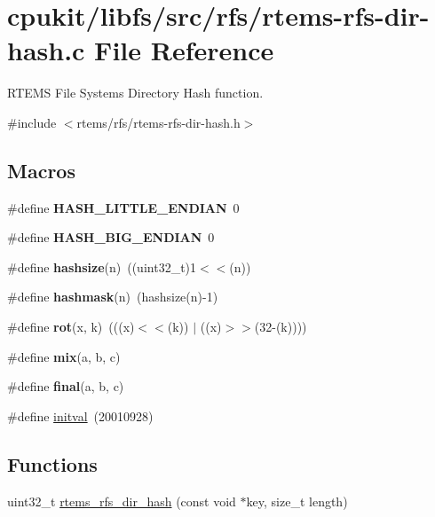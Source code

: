 \hypertarget{rtems-rfs-dir-hash_8c}{}\section{cpukit/libfs/src/rfs/rtems-\/rfs-\/dir-\/hash.c File Reference}
\label{rtems-rfs-dir-hash_8c}


R\+T\+E\+MS File Systems Directory Hash function.  


{\ttfamily \#include $<$rtems/rfs/rtems-\/rfs-\/dir-\/hash.\+h$>$}\newline
\subsection*{Macros}
\begin{DoxyCompactItemize}
\item 
\mbox{\label{rtems-rfs-dir-hash_8c_a8c49a94782a573ded31a7bb1949cbf47}} 
\#define {\bfseries H\+A\+S\+H\+\_\+\+L\+I\+T\+T\+L\+E\+\_\+\+E\+N\+D\+I\+AN}~0
\item 
\mbox{\label{rtems-rfs-dir-hash_8c_a129f72057b84147c7c3e2a6d107f0e3b}} 
\#define {\bfseries H\+A\+S\+H\+\_\+\+B\+I\+G\+\_\+\+E\+N\+D\+I\+AN}~0
\item 
\mbox{\label{rtems-rfs-dir-hash_8c_a86173ca25b300cf3276b088d3fc6bdaf}} 
\#define {\bfseries hashsize}(n)~((uint32\+\_\+t)1$<$$<$(n))
\item 
\mbox{\label{rtems-rfs-dir-hash_8c_aacd6ed104463685849b2550389d05ff3}} 
\#define {\bfseries hashmask}(n)~(hashsize(n)-\/1)
\item 
\mbox{\label{rtems-rfs-dir-hash_8c_aae44e21ada356d9d84450d5440fbb0c4}} 
\#define {\bfseries rot}(x,  k)~(((x)$<$$<$(k)) $\vert$ ((x)$>$$>$(32-\/(k))))
\item 
\#define {\bfseries mix}(a,  b,  c)
\item 
\#define {\bfseries final}(a,  b,  c)
\item 
\#define \mbox{\hyperlink{rtems-rfs-dir-hash_8c_ab923cd808775ddf3747372391084f778}{initval}}~(20010928)
\end{DoxyCompactItemize}
\subsection*{Functions}
\begin{DoxyCompactItemize}
\item 
uint32\+\_\+t \mbox{\hyperlink{rtems-rfs-dir-hash_8c_a9a48bb16458d3a175e425382193e75f3}{rtems\+\_\+rfs\+\_\+dir\+\_\+hash}} (const void $\ast$key, size\+\_\+t length)
\end{DoxyCompactItemize}


